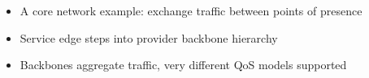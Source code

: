 \begin{itemize}
    \item A core network example: exchange traffic between points of presence
    \item Service edge steps into provider backbone hierarchy
    \item Backbones aggregate traffic, very different QoS models supported
\end{itemize}
